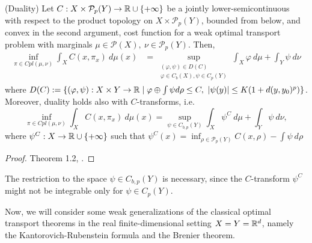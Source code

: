 \documentclass[../main.tex]{subfiles}
\begin{document}
\begin{theorem} 
    \label{thm:WOT_duality}
    (Duality)
    Let $C: X \times \mathcal{P}_p(Y)\to \mathbb{R}\cup\{+\infty\}$ be a jointly lower-semicontinuous with respect to the product topology on $X\times\mathcal{P}_p(Y)$, bounded from below, and convex in the second argument, cost function for a weak optimal transport problem with marginals $\mu\in\mathcal{P}(X), \ \nu\in\mathcal{P}_p(Y)$. Then,
    \begin{align*}
        \inf_{\pi\in Cpl(\mu, \nu)} \int_X C(x, \pi_x) \ d\mu(x) 
        &= \sup_{\substack{(\varphi, \psi)\in D(C) \\ \varphi\in C_b(X), \psi\in C_p(Y)}} \int_X \varphi \ d \mu + \int_Y \psi \ d \nu
    \end{align*}
    where $D(C) :=\{(\varphi, \psi) : X\times Y \to \mathbb{R} \mid \varphi \oplus \int\psi d\rho \leq C, \ |\psi(y)| \leq K(1 + d(y, y_0)^p)\}$. \\
    Moreover, duality holds also with $C$-transforms, i.e.
    $$
    \inf_{\pi\in Cpl(\mu, \nu)} \int_X C(x, \pi_x) \ d\mu(x) 
    = \sup_{\psi\in C_{b,p}(Y)} \int_X \psi^C \ d \mu + \int_Y \psi \ d \nu,
    $$
    where $\psi^C : X \to \mathbb{R}\cup\{+\infty\}$ such that $\psi^C(x) = \inf_{\rho\in\mathcal{P}_p(Y)} C(x, \rho) - \int \psi \ d \rho$
\end{theorem}
\begin{proof}
    Theorem 1.2, \cite{backhoff2019existence}.
\end{proof}

\begin{remark}
    The restriction to the space $\psi\in C_{b, p}(Y)$ is necessary, since the $C$-transform $\psi^C$ might not be integrable only for $\psi\in C_p(Y)$.
\end{remark}

Now, we will consider some weak generalizations of the classical optimal transport theorems in the real finite-dimensional setting $X= Y=\mathbb{R}^d$, namely the Kantorovich-Rubenstein formula and the Brenier theorem.
\end{document}
